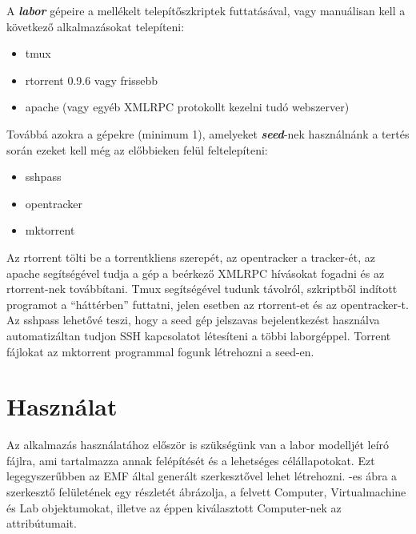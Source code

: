 A \textit{\textbf{labor}} gépeire a mellékelt telepítőszkriptek futtatásával, vagy manuálisan kell a következő alkalmazásokat telepíteni:
\begin{itemize}
  \item tmux
  \item rtorrent 0.9.6 vagy frissebb
  \item apache (vagy egyéb XMLRPC protokollt kezelni tudó webszerver)
\end{itemize}

Továbbá azokra a gépekre (minimum 1), amelyeket \textit{\textbf{seed}}-nek használnánk a tertés során ezeket kell még az előbbieken felül feltelepíteni:
\begin{itemize}
  \item	sshpass
  \item opentracker
  \item mktorrent
\end{itemize}

Az rtorrent tölti be a torrentkliens szerepét, az opentracker a tracker-ét, az apache segítségével tudja a gép a beérkező XMLRPC hívásokat fogadni és az rtorrent-nek továbbítani. Tmux segítségével tudunk távolról, szkriptből indított programot a ``háttérben'' futtatni, jelen esetben az rtorrent-et és az opentracker-t. Az sshpass lehetővé teszi, hogy a seed gép jelszavas bejelentkezést használva automatizáltan tudjon SSH kapcsolatot létesíteni a többi laborgéppel. Torrent fájlokat az mktorrent programmal fogunk létrehozni a seed-en.

\section{Használat}

Az alkalmazás használatához először is szükségünk van a labor modelljét leíró fájlra, ami tartalmazza annak felépítését és a lehetséges célállapotokat. Ezt legegyszerűbben az EMF által generált szerkesztővel lehet létrehozni. -es ábra a szerkesztő felületének egy részletét ábrázolja, a felvett Computer, Virtualmachine és Lab objektumokat, illetve az éppen kiválasztott Computer-nek az attribútumait.

